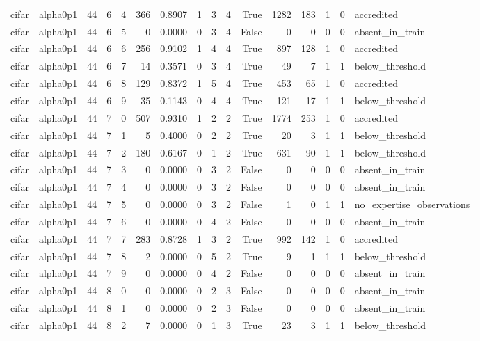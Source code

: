 \begin{tabular}{llrrrrrrrrrrrrrl}
cifar & alpha0p1 & 44 & 6 & 4 & 366 & 0.8907 & 1 & 3 & 4 & True & 1282 & 183 & 1 & 0 & accredited \\
cifar & alpha0p1 & 44 & 6 & 5 & 0 & 0.0000 & 0 & 3 & 4 & False & 0 & 0 & 0 & 0 & absent\_in\_train \\
cifar & alpha0p1 & 44 & 6 & 6 & 256 & 0.9102 & 1 & 4 & 4 & True & 897 & 128 & 1 & 0 & accredited \\
cifar & alpha0p1 & 44 & 6 & 7 & 14 & 0.3571 & 0 & 3 & 4 & True & 49 & 7 & 1 & 1 & below\_threshold \\
cifar & alpha0p1 & 44 & 6 & 8 & 129 & 0.8372 & 1 & 5 & 4 & True & 453 & 65 & 1 & 0 & accredited \\
cifar & alpha0p1 & 44 & 6 & 9 & 35 & 0.1143 & 0 & 4 & 4 & True & 121 & 17 & 1 & 1 & below\_threshold \\
cifar & alpha0p1 & 44 & 7 & 0 & 507 & 0.9310 & 1 & 2 & 2 & True & 1774 & 253 & 1 & 0 & accredited \\
cifar & alpha0p1 & 44 & 7 & 1 & 5 & 0.4000 & 0 & 2 & 2 & True & 20 & 3 & 1 & 1 & below\_threshold \\
cifar & alpha0p1 & 44 & 7 & 2 & 180 & 0.6167 & 0 & 1 & 2 & True & 631 & 90 & 1 & 1 & below\_threshold \\
cifar & alpha0p1 & 44 & 7 & 3 & 0 & 0.0000 & 0 & 3 & 2 & False & 0 & 0 & 0 & 0 & absent\_in\_train \\
cifar & alpha0p1 & 44 & 7 & 4 & 0 & 0.0000 & 0 & 3 & 2 & False & 0 & 0 & 0 & 0 & absent\_in\_train \\
cifar & alpha0p1 & 44 & 7 & 5 & 0 & 0.0000 & 0 & 3 & 2 & False & 1 & 0 & 1 & 1 & no\_expertise\_observations \\
cifar & alpha0p1 & 44 & 7 & 6 & 0 & 0.0000 & 0 & 4 & 2 & False & 0 & 0 & 0 & 0 & absent\_in\_train \\
cifar & alpha0p1 & 44 & 7 & 7 & 283 & 0.8728 & 1 & 3 & 2 & True & 992 & 142 & 1 & 0 & accredited \\
cifar & alpha0p1 & 44 & 7 & 8 & 2 & 0.0000 & 0 & 5 & 2 & True & 9 & 1 & 1 & 1 & below\_threshold \\
cifar & alpha0p1 & 44 & 7 & 9 & 0 & 0.0000 & 0 & 4 & 2 & False & 0 & 0 & 0 & 0 & absent\_in\_train \\
cifar & alpha0p1 & 44 & 8 & 0 & 0 & 0.0000 & 0 & 2 & 3 & False & 0 & 0 & 0 & 0 & absent\_in\_train \\
cifar & alpha0p1 & 44 & 8 & 1 & 0 & 0.0000 & 0 & 2 & 3 & False & 0 & 0 & 0 & 0 & absent\_in\_train \\
cifar & alpha0p1 & 44 & 8 & 2 & 7 & 0.0000 & 0 & 1 & 3 & True & 23 & 3 & 1 & 1 & below\_threshold \\

\end{tabular}
